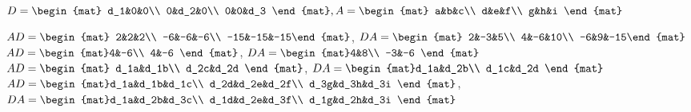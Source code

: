 \begin{Exercise}[
name={},
title={}, 
difficulty=0,
origin={\cite{GH}}]
\begin{multicols}{2}
\Question $D=\begin{mat} d_1&0&0\\  0&d_2&0\\  0&0&d_3 \end{mat}, \\ A=\begin{mat} a&b&c\\  d&e&f\\  g&h&i \end{mat}$
\EndCurrentQuestion
\end{multicols}

\end{Exercise}

\begin{Answer}
\Question $AD = \begin{mat} 2&2&2\\  -6&-6&-6\\  -15&-15&-15\end{mat}$, $DA = \begin{mat} 2&-3&5\\  4&-6&10\\  -6&9&-15\end{mat}$
\Question $AD = \begin{mat}4&-6\\  4&-6 \end{mat}$, $DA = \begin{mat}4&8\\  -3&-6 \end{mat}$
\Question $AD = \begin{mat} d_1a&d_1b\\  d_2c&d_2d \end{mat}$, $DA = \begin{mat}d_1a&d_2b\\  d_1c&d_2d \end{mat}$
\Question $AD = \begin{mat}d_1a&d_1b&d_1c\\  d_2d&d_2e&d_2f\\  d_3g&d_3h&d_3i \end{mat}$, $DA = \begin{mat}d_1a&d_2b&d_3c\\  d_1d&d_2e&d_3f\\  d_1g&d_2h&d_3i \end{mat}$
\end{Answer}
